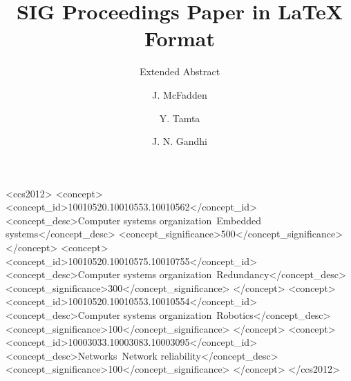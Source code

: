 \documentclass[sigconf]{acmart}
\begin{document}
\title{SIG Proceedings Paper in LaTeX Format}
\subtitle{Extended Abstract}


\author{J. McFadden}
\authornote{}
\orcid{}

\author{Y. Tamta}
\authornote{}
\orcid{}

\author{J. N. Gandhi}
\authornote{}
\orcid{}



\renewcommand{\shortauthors}{J. McFadden, Y. Tamta, J. N. Gandhi, et al}


\begin{abstract}

\end{abstract}

%
%
\begin{CCSXML}
<ccs2012>
 <concept>
  <concept_id>10010520.10010553.10010562</concept_id>
  <concept_desc>Computer systems organization~Embedded systems</concept_desc>
  <concept_significance>500</concept_significance>
 </concept>
 <concept>
  <concept_id>10010520.10010575.10010755</concept_id>
  <concept_desc>Computer systems organization~Redundancy</concept_desc>
  <concept_significance>300</concept_significance>
 </concept>
 <concept>
  <concept_id>10010520.10010553.10010554</concept_id>
  <concept_desc>Computer systems organization~Robotics</concept_desc>
  <concept_significance>100</concept_significance>
 </concept>
 <concept>
  <concept_id>10003033.10003083.10003095</concept_id>
  <concept_desc>Networks~Network reliability</concept_desc>
  <concept_significance>100</concept_significance>
 </concept>
</ccs2012>  
\end{CCSXML}





\maketitle




 
\end{document}
